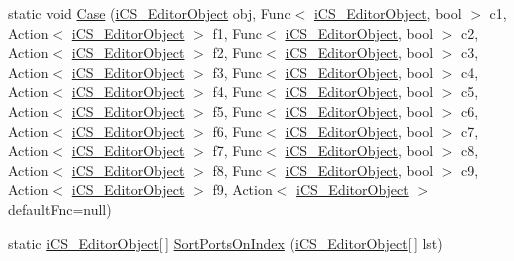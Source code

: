 \begin{DoxyCompactItemize}
static void \hyperlink{classi_c_s___i_storage_a118d0baeeaa9598f5c6b0891d54834d3}{Case} (\hyperlink{classi_c_s___editor_object}{i\+C\+S\+\_\+\+Editor\+Object} obj, Func$<$ \hyperlink{classi_c_s___editor_object}{i\+C\+S\+\_\+\+Editor\+Object}, bool $>$ c1, Action$<$ \hyperlink{classi_c_s___editor_object}{i\+C\+S\+\_\+\+Editor\+Object} $>$ f1, Func$<$ \hyperlink{classi_c_s___editor_object}{i\+C\+S\+\_\+\+Editor\+Object}, bool $>$ c2, Action$<$ \hyperlink{classi_c_s___editor_object}{i\+C\+S\+\_\+\+Editor\+Object} $>$ f2, Func$<$ \hyperlink{classi_c_s___editor_object}{i\+C\+S\+\_\+\+Editor\+Object}, bool $>$ c3, Action$<$ \hyperlink{classi_c_s___editor_object}{i\+C\+S\+\_\+\+Editor\+Object} $>$ f3, Func$<$ \hyperlink{classi_c_s___editor_object}{i\+C\+S\+\_\+\+Editor\+Object}, bool $>$ c4, Action$<$ \hyperlink{classi_c_s___editor_object}{i\+C\+S\+\_\+\+Editor\+Object} $>$ f4, Func$<$ \hyperlink{classi_c_s___editor_object}{i\+C\+S\+\_\+\+Editor\+Object}, bool $>$ c5, Action$<$ \hyperlink{classi_c_s___editor_object}{i\+C\+S\+\_\+\+Editor\+Object} $>$ f5, Func$<$ \hyperlink{classi_c_s___editor_object}{i\+C\+S\+\_\+\+Editor\+Object}, bool $>$ c6, Action$<$ \hyperlink{classi_c_s___editor_object}{i\+C\+S\+\_\+\+Editor\+Object} $>$ f6, Func$<$ \hyperlink{classi_c_s___editor_object}{i\+C\+S\+\_\+\+Editor\+Object}, bool $>$ c7, Action$<$ \hyperlink{classi_c_s___editor_object}{i\+C\+S\+\_\+\+Editor\+Object} $>$ f7, Func$<$ \hyperlink{classi_c_s___editor_object}{i\+C\+S\+\_\+\+Editor\+Object}, bool $>$ c8, Action$<$ \hyperlink{classi_c_s___editor_object}{i\+C\+S\+\_\+\+Editor\+Object} $>$ f8, Func$<$ \hyperlink{classi_c_s___editor_object}{i\+C\+S\+\_\+\+Editor\+Object}, bool $>$ c9, Action$<$ \hyperlink{classi_c_s___editor_object}{i\+C\+S\+\_\+\+Editor\+Object} $>$ f9, Action$<$ \hyperlink{classi_c_s___editor_object}{i\+C\+S\+\_\+\+Editor\+Object} $>$ default\+Fnc=null)
\item 
static \hyperlink{classi_c_s___editor_object}{i\+C\+S\+\_\+\+Editor\+Object}\mbox{[}$\,$\mbox{]} \hyperlink{classi_c_s___i_storage_a37c2cdfbf1abe04bddaea286440c8f36}{Sort\+Ports\+On\+Index} (\hyperlink{classi_c_s___editor_object}{i\+C\+S\+\_\+\+Editor\+Object}\mbox{[}$\,$\mbox{]} lst)
\end{DoxyCompactItemize}
